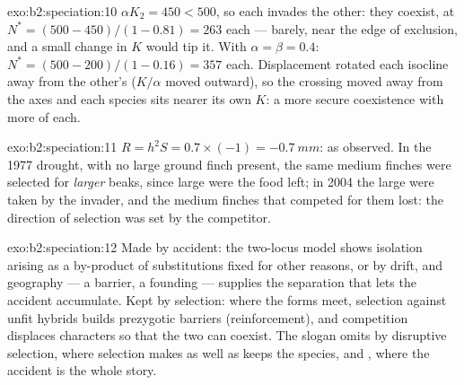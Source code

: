 \begin{solution}{exo:b2:speciation:10}
$\alpha K_2 = 450 < 500$, so each invades the other: they coexist,
at $N^{*} = (500 - 450)/(1 - 0.81) = 263$ each --- barely, near the
edge of exclusion, and a small change in $K$ would tip it. With
$\alpha = \beta = 0.4$: $N^{*} = (500 - 200)/(1 - 0.16) = 357$ each.
Displacement rotated each isocline away from the other's ($K/\alpha$
moved outward), so the crossing moved away from the axes and each
species sits nearer its own $K$: a more secure coexistence with
more of each.
\end{solution}

\begin{solution}{exo:b2:speciation:11}
$R = h^{2}S = 0.7\times(-1) = \qty{-0.7}{mm}$: as observed. In the
1977 drought, with no large ground finch present, the same medium
finches were selected for \emph{larger} beaks, since large 
were the food left; in 2004 the large  were taken by the
invader, and the medium finches that competed for them lost: the
direction of selection was set by the competitor.
\end{solution}

\begin{solution}{exo:b2:speciation:12}
Made by accident: the two-locus model shows isolation arising as a
by-product of substitutions fixed for other reasons, or by drift,
and geography --- a barrier, a founding --- supplies the separation
that lets the accident accumulate. Kept by selection: where the
forms meet, selection against unfit hybrids builds prezygotic
barriers (reinforcement), and competition displaces characters so
that the two can coexist. The slogan omits  by
disruptive selection, where selection makes as well as keeps the
species, and , where the accident is the whole story.
\end{solution}

